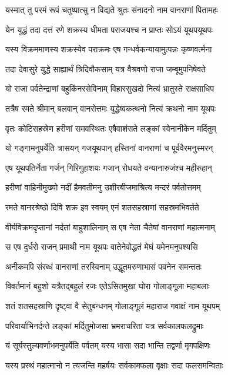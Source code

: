 \twolineshloka
{यस्मात् तु परमं रूपं चतुष्पात्सु न विद्यते}
{श्रुतः संनादनो नाम वानराणां पितामहः} %

\twolineshloka
{येन युद्धं तदा दत्तं रणे शक्रस्य धीमता}
{पराजयश्च न प्राप्तः सोऽयं यूथपयूथपः} %

\twolineshloka
{यस्य विक्रममाणस्य शक्रस्येव पराक्रमः}
{एष गन्धर्वकन्यायामुत्पन्नः कृष्णवर्त्मना} %

\twolineshloka
{तदा देवासुरे युद्धे साह्यार्थं त्रिदिवौकसाम्}
{यत्र वैश्रवणो राजा जम्बूमुपनिषेवते} %

\twolineshloka
{यो राजा पर्वतेन्द्राणां बहुकिंनरसेविनाम्}
{विहारसुखदो नित्यं भ्रातुस्ते राक्षसाधिप} %

\twolineshloka
{तत्रैष रमते श्रीमान् बलवान् वानरोत्तमः}
{युद्धेष्वकत्थनो नित्यं क्रथनो नाम यूथपः} %

\twolineshloka
{वृतः कोटिसहस्रेण हरीणां समवस्थितः}
{एषैवाशंसते लङ्कां स्वेनानीकेन मर्दितुम्} %

\twolineshloka
{यो गङ्गामनुपर्येति त्रासयन् गजयूथपान्}
{हस्तिनां वानराणां च पूर्ववैरमनुस्मरन्} %

\twolineshloka
{एष यूथपतिर्नेता गर्जन् गिरिगुहाशयः}
{गजान् रोधयते वन्यानारुजंश्च महीरुहान्} %

\twolineshloka
{हरीणां वाहिनीमुख्यो नदीं हैमवतीमनु}
{उशीरबीजमाश्रित्य मन्दरं पर्वतोत्तमम्} %

\twolineshloka
{रमते वानरश्रेष्ठो दिवि शक्र इव स्वयम्}
{एनं शतसहस्राणां सहस्रमभिवर्तते} %

\twolineshloka
{वीर्यविक्रमदृप्तानां नर्दतां बाहुशालिनाम्}
{स एष नेता चैतेषां वानराणां महात्मनाम्} %

\twolineshloka
{स एष दुर्धरो राजन् प्रमाथी नाम यूथपः}
{वातेनेवोद्धतं मेघं यमेनमनुपश्यसि} %

\twolineshloka
{अनीकमपि संरब्धं वानराणां तरस्विनाम्}
{उद्धूतमरुणाभासं पवनेन समन्ततः} %

\twolineshloka
{विवर्तमानं बहुशो यत्रैतद्बहुलं रजः}
{एतेऽसितमुखा घोरा गोलाङ्गूला महाबलाः} %

\twolineshloka
{शतं शतसहस्राणि दृष्ट्वा वै सेतुबन्धनम्}
{गोलाङ्गूलं महाराज गवाक्षं नाम यूथपम्} %

\twolineshloka
{परिवार्याभिनर्दन्ते लङ्कां मर्दितुमोजसा}
{भ्रमराचरिता यत्र सर्वकालफलद्रुमाः} %

\twolineshloka
{यं सूर्यस्तुल्यवर्णाभमनुपर्येति पर्वतम्}
{यस्य भासा सदा भान्ति तद्वर्णा मृगपक्षिणः} %

\twolineshloka
{यस्य प्रस्थं महात्मानो न त्यजन्ति महर्षयः}
{सर्वकामफला वृक्षाः सदा फलसमन्विताः} %

